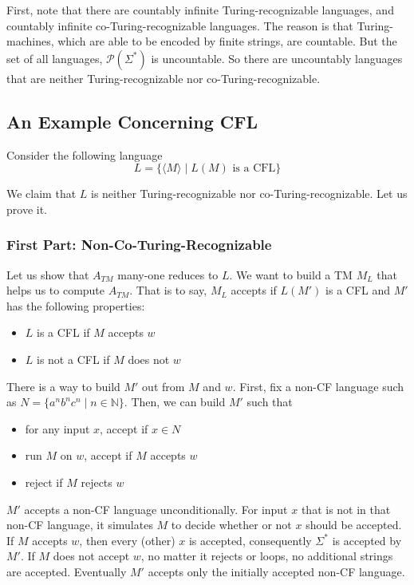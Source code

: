 \documentclass[11pt]{article}
\begin{document}
First, note that there are countably infinite Turing-recognizable languages, and countably infinite
co-Turing-recognizable languages. The reason is that Turing-machines, which are able to be encoded
by finite strings, are countable. But the set of all languages, $\mathcal{P}(\Sigma^\ast)$ is
uncountable. So there are uncountably languages that are neither Turing-recognizable nor
co-Turing-recognizable.

\subsection{An Example Concerning CFL}

Consider the following language
\[
  L = \{\langle M \rangle \mid L(M) \text{ is a CFL}\}
\]

We claim that $L$ is neither Turing-recognizable nor co-Turing-recognizable. Let us prove it.

\subsubsection{First Part: Non-Co-Turing-Recognizable}

Let us show that $A_{TM}$ many-one reduces to $L$. We want to build a TM $M_L$ that helps us to
compute $A_{TM}$. That is to say, $M_L$ accepts if $L(M')$ is a CFL and $M'$ has the following
properties:
\begin{itemize}
\item $L$ is a CFL if $M$ accepts $w$
\item $L$ is not a CFL if $M$ does not $w$
\end{itemize}

There is a way to build $M'$ out from $M$ and $w$. First, fix a non-CF language such as
$N = \{a^nb^nc^n \mid n \in \mathbb{N}\}$. Then, we can build $M'$ such that
\begin{itemize}
\item for any input $x$, accept if $x \in N$
\item run $M$ on $w$, accept if $M$ accepts $w$
\item reject if $M$ rejects $w$
\end{itemize}

$M'$ accepts a non-CF language unconditionally. For input $x$ that is not in that non-CF
language, it simulates $M$ to decide whether or not $x$ should be accepted. If $M$ accepts
$w$, then every (other) $x$ is accepted, consequently $\Sigma^\ast$ is accepted by $M'$.
If $M$ does not accept $w$, no matter it rejects or loops, no additional strings are
accepted. Eventually $M'$ accepts only the initially accepted non-CF language.
\end{document}
